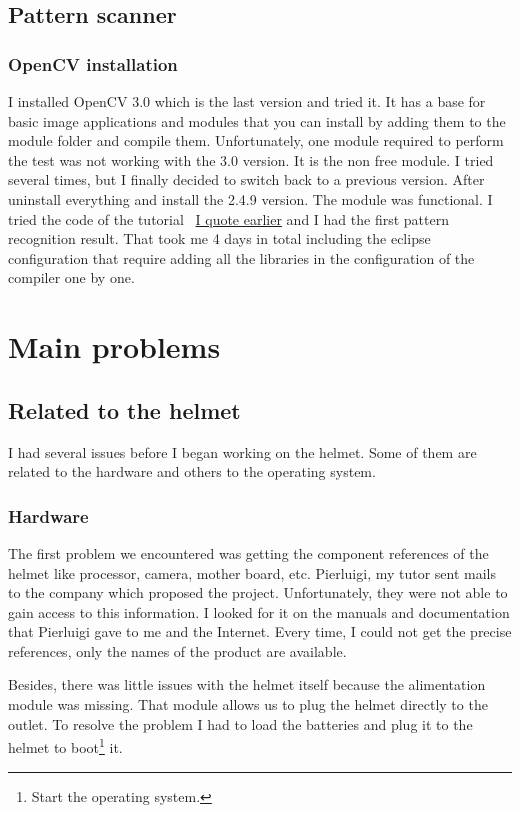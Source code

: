 	\subsection{Pattern scanner}
	\subsubsection{OpenCV installation}

	\par I installed OpenCV 3.0 which is the last version and tried it. It has a base for basic image applications and modules that you can install by adding them to the module folder and compile them. Unfortunately, one module required to perform the test was not working with the 3.0 version. It is the non free module. I tried several times, but I finally decided to switch back to a previous version. After uninstall everything and install the 2.4.9 version. The module was functional. I tried the code of the tutorial ~\hyperlink{opencv}{I quote earlier} and I had the first pattern recognition result. That took me 4 days in total including the eclipse configuration that require adding all the libraries in the configuration of the compiler one by one.
	
	\section{Main problems}	
	\subsection{Related to the helmet}
	\par I had several issues before I began working on the helmet. Some of them are related to the hardware and others to the operating system.
	\subsubsection{Hardware}
	\par The first problem we encountered was getting the component references of the helmet like processor, camera, mother board, etc. Pierluigi, my tutor sent mails to the company which proposed the project. Unfortunately, they were not able to gain access to this information. I looked for it on the manuals and documentation that Pierluigi gave to me and the Internet. Every time, I could not get the precise references, only the names of the product are available.

	\par Besides, there was little issues with the helmet itself because the alimentation module was missing. That module allows us to plug the helmet directly to the outlet. To resolve the problem I had to load the batteries and plug it to the helmet to boot\footnote{Start the operating system.} it.

